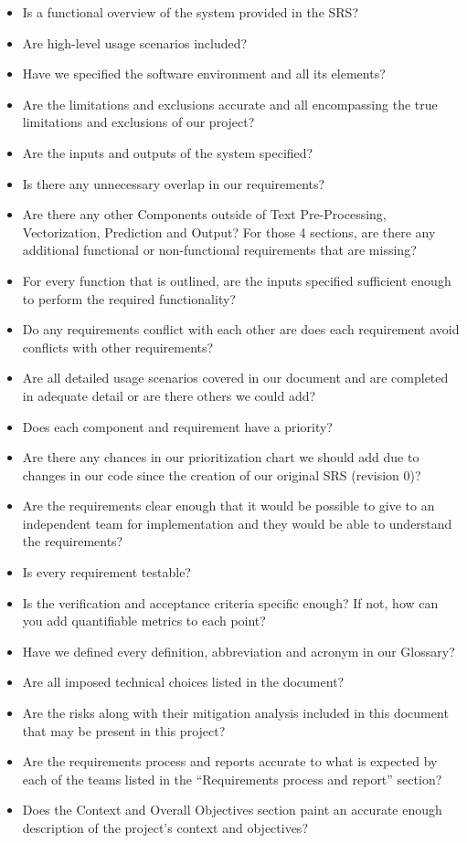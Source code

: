 \documentclass[12pt, titlepage]{article}
\begin{document}
  \begin{itemize}
  \item Is a functional overview of the system provided in the SRS?
  \item Are high-level usage scenarios included?
  \item Have we specified the software environment and all its elements?
  \item Are the limitations and exclusions accurate and all encompassing the true limitations and exclusions of our project?
  \item Are the inputs and outputs of the system specified?
  \item Is there any unnecessary overlap in our requirements?
  \item Are there any other Components outside of Text Pre-Processing, Vectorization, Prediction and Output? For those 4 sections, are there any additional functional or non-functional requirements that are missing?
  \item For every function that is outlined, are the inputs specified sufficient enough to perform the required functionality?
  \item Do any requirements conflict with each other are does each requirement avoid conflicts with other requirements?
  \item Are all detailed usage scenarios covered in our document and are completed in adequate detail or are there others we could add?
  \item Does each component and requirement have a priority?
  \item Are there any chances in our prioritization chart we should add due to changes in our code since the creation of our original SRS (revision 0)?
  \item Are the requirements clear enough that it would be possible to give to an independent team for implementation and they would be able to understand the requirements?
  \item Is every requirement testable?
  \item Is the verification and acceptance criteria specific enough? If not, how can you add quantifiable metrics to each point?
  \item Have we defined every definition, abbreviation and acronym in our Glossary?
  \item Are all imposed technical choices listed in the document?
  \item Are the risks along with their mitigation analysis included in this document that may be present in this project?
  \item Are the requirements process and reports accurate to what is expected by each of the teams listed in the “Requirements process and report” section?
  \item Does the Context and Overall Objectives section paint an accurate enough description of the project's context and objectives?\\
  \end{itemize}
  
\end{document}
